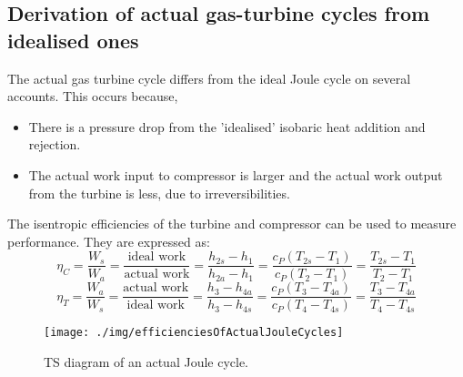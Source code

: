 \subsection{Derivation of actual gas-turbine cycles from idealised ones}
The actual gas turbine cycle differs from the ideal Joule cycle on several accounts. This occurs because,
\begin{itemize}[noitemsep]
  \item There is a pressure drop from the 'idealised' isobaric heat addition and rejection.
  \item The actual work input to compressor is larger and the actual work output from the turbine is less, due to irreversibilities.
\end{itemize}
The isentropic efficiencies of the turbine and compressor can be used to measure performance. They are expressed as:
\begin{equation}
  \eta_C = \frac{W_s}{W_a} = \frac{\textrm{ideal work}}{\textrm{actual work}} = \frac{h_{2s} - h_1}{h_{2a} - h_1} = \frac{c_P (T_{2s} - T_1)}{c_P (T_2 -T_1)} = \frac{T_{2s} - T_1}{T_2 - T_1}
\end{equation}
\begin{equation}
  \eta_T = \frac{W_a}{W_s} = \frac{\textrm{actual work}}{\textrm{ideal work}} = \frac{h_{3} - h_{4a}}{h_{3} - h_{4s}} = \frac{c_P (T_{3} - T_{4a})}{c_P (T_4 -T_{4s})} = \frac{T_{3} - T_{4a}}{T_4 - T_{4s}}
\end{equation}
\begin{figure}
  \centering
  \texttt{[image: ./img/efficienciesOfActualJouleCycles]}
  \caption{TS diagram of an actual Joule cycle.}
\end{figure}